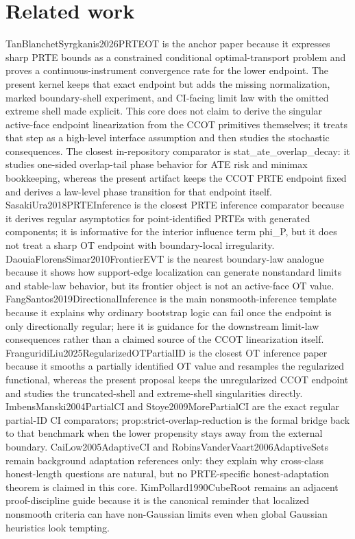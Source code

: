 \documentclass{article}
\begin{document}
\section{Related work}

TanBlanchetSyrgkanis2026PRTEOT is the anchor paper because it expresses sharp PRTE bounds as a constrained conditional optimal-transport problem and proves a continuous-instrument convergence rate for the lower endpoint. The present kernel keeps that exact endpoint but adds the missing normalization, marked boundary-shell experiment, and CI-facing limit law with the omitted extreme shell made explicit. This core does not claim to derive the singular active-face endpoint linearization from the CCOT primitives themselves; it treats that step as a high-level interface assumption and then studies the stochastic consequences. The closest in-repository comparator is stat_ate_overlap_decay: it studies one-sided overlap-tail phase behavior for ATE risk and minimax bookkeeping, whereas the present artifact keeps the CCOT PRTE endpoint fixed and derives a law-level phase transition for that endpoint itself. SasakiUra2018PRTEInference is the closest PRTE inference comparator because it derives regular asymptotics for point-identified PRTEs with generated components; it is informative for the interior influence term phi_P, but it does not treat a sharp OT endpoint with boundary-local irregularity. DaouiaFlorensSimar2010FrontierEVT is the nearest boundary-law analogue because it shows how support-edge localization can generate nonstandard limits and stable-law behavior, but its frontier object is not an active-face OT value. FangSantos2019DirectionalInference is the main nonsmooth-inference template because it explains why ordinary bootstrap logic can fail once the endpoint is only directionally regular; here it is guidance for the downstream limit-law consequences rather than a claimed source of the CCOT linearization itself. FranguridiLiu2025RegularizedOTPartialID is the closest OT inference paper because it smooths a partially identified OT value and resamples the regularized functional, whereas the present proposal keeps the unregularized CCOT endpoint and studies the truncated-shell and extreme-shell singularities directly. ImbensManski2004PartialCI and Stoye2009MorePartialCI are the exact regular partial-ID CI comparators; prop:strict-overlap-reduction is the formal bridge back to that benchmark when the lower propensity stays away from the external boundary. CaiLow2005AdaptiveCI and RobinsVanderVaart2006AdaptiveSets remain background adaptation references only: they explain why cross-class honest-length questions are natural, but no PRTE-specific honest-adaptation theorem is claimed in this core. KimPollard1990CubeRoot remains an adjacent proof-discipline guide because it is the canonical reminder that localized nonsmooth criteria can have non-Gaussian limits even when global Gaussian heuristics look tempting.
\end{document}
